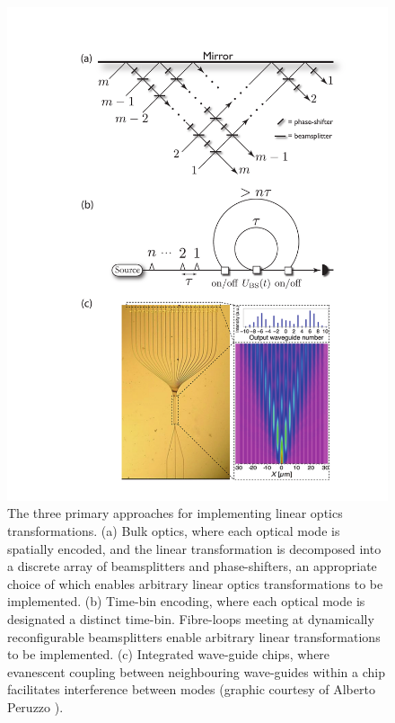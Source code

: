 \documentclass[aps,rmp,twocolumn,amsmath,amssymb,nofootinbib,superscriptaddress,longbibliography,floatfix,table-of-contents,eqsecnum]{revtex4-1}
\begin{document}
\begin{figure}[!htb]
\includegraphics[width=\columnwidth]{LO_archs}
\caption{The three primary approaches for implementing linear optics transformations. (a) Bulk optics, where each optical mode is spatially encoded, and the linear transformation is decomposed into a discrete array of beamsplitters and phase-shifters, an appropriate choice of which enables arbitrary linear optics transformations to be implemented. (b) Time-bin encoding, where each optical mode is designated a distinct time-bin. Fibre-loops meeting at dynamically reconfigurable beamsplitters enable arbitrary linear transformations to be implemented. (c) Integrated wave-guide chips, where evanescent coupling between neighbouring wave-guides within a chip facilitates interference between modes (graphic courtesy of Alberto Peruzzo \cite{bib:PeruzzoQW}).} \label{fig:LO_archs}
\end{figure}
\end{document}
